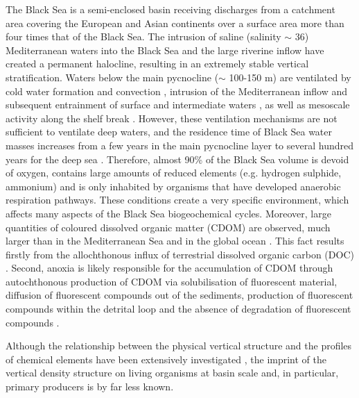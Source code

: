 \documentclass[journal abbreviation, manuscript]{copernicus}
\begin{document}
\introduction  %
The Black Sea is a semi-enclosed basin receiving discharges from a catchment area covering the European and Asian continents over a surface area more than four times that of the Black Sea. The intrusion of saline (salinity $\sim$ 36) Mediterranean waters into the Black Sea and the large riverine inflow have created a permanent halocline, resulting in an extremely stable vertical stratification. Waters below the main pycnocline ($\sim$ 100-150 \unit{m}) are ventilated by cold water formation and convection \citep{Ivanov1997, Stanev2003, Miladinova2018}, intrusion of the Mediterranean inflow and subsequent entrainment of surface and intermediate waters \citep{Ozsoy2001, Falina2017}, as well as mesoscale activity along the shelf break \citep{Ostrovskii2016}.
However, these ventilation mechanisms are not sufficient to ventilate deep waters, and the residence time of Black Sea water masses increases from a few years in the main pycnocline layer to several hundred years for the deep sea \citep{murray1991}.
Therefore, almost 90\% of the Black Sea volume is devoid of oxygen, contains large amounts of reduced elements (e.g. hydrogen sulphide, ammonium) and is only inhabited by organisms that have developed anaerobic respiration pathways. These conditions create a very specific environment, which affects many aspects of the Black Sea biogeochemical cycles. Moreover, large quantities of coloured dissolved organic matter (CDOM) are observed, much larger than in the Mediterranean Sea \citep{Organelli2014} and in the global ocean \citep{Nelson2013}. This fact results firstly from the allochthonous influx of terrestrial dissolved organic carbon (DOC) \citep{ducklow2007, margolin2016, margolin2018}. Second, anoxia is likely responsible for the accumulation of CDOM through autochthonous production of CDOM via solubilisation of fluorescent material, diffusion of fluorescent compounds out of the sediments, production of fluorescent compounds within the detrital loop and the absence of degradation of fluorescent compounds \citep{Coble1991, Para2010}.

Although the relationship between the physical vertical structure and the profiles of chemical elements have been extensively investigated \citep[e.g.][]{Tugrul1992,Konovalov2001}, the imprint of the vertical density structure on living organisms at basin scale and, in particular, primary producers is by far less known. 
\end{document}
